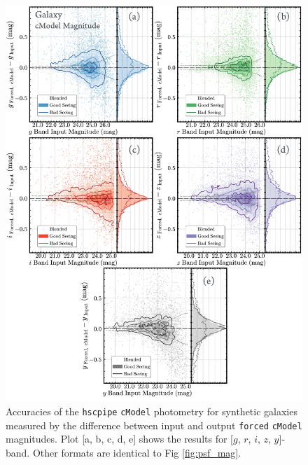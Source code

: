 \documentclass[useamsfonts]{pasj01}
\def\cmodel{\texttt{cModel}}
\def\forced{\texttt{forced}}
\begin{document}
\begin{figure}
    \begin{center}
        \includegraphics[width=16cm]{fig/synpipe_galaxy_mag}
    \end{center}
    \caption{
        Accuracies of the \texttt{hscpipe} \cmodel{} photometry for synthetic
        galaxies measured by the difference between input and output \forced{}
        \cmodel{} magnitudes.
        Plot [a, b, c, d, e] shows the results for [$g$, $r$, $i$, $z$, $y$]-band.
        Other formats are identical to Fig \ref{fig:psf_mag}.
        }
    \label{fig:cmodel_mag}
\end{figure}
\end{document}
